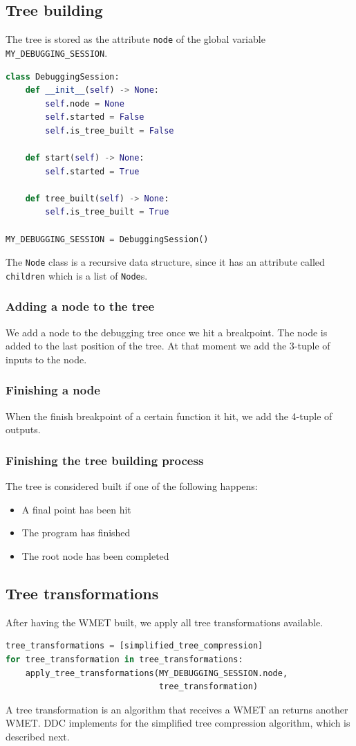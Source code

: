 \subsection{Tree building}
The tree is stored as the attribute \verb|node| of the global variable \verb|MY_DEBUGGING_SESSION|.
\begin{lstlisting}[language=Python, caption=DebuggingSession class and global object]
class DebuggingSession:
    def __init__(self) -> None:
        self.node = None
        self.started = False
        self.is_tree_built = False

    def start(self) -> None:
        self.started = True

    def tree_built(self) -> None:
        self.is_tree_built = True

MY_DEBUGGING_SESSION = DebuggingSession()
\end{lstlisting}
The \verb|Node| class is a recursive data structure, since it has an attribute called \verb|children| which is a list of \verb|Node|s.
\subsubsection{Adding a node to the tree}
We add a node to the debugging tree once we hit a breakpoint.
The node is added to the last position of the tree.
At that moment we add the 3-tuple of inputs to the node.
\subsubsection{Finishing a node}
When the finish breakpoint of a certain function it hit, we add the 4-tuple of outputs.
\subsubsection{Finishing the tree building process}
The tree is considered built if one of the following happens:
\begin{itemize}
    \item A final point has been hit
    \item The program has finished
    \item The root node has been completed
\end{itemize}
\subsection{Tree transformations}
After having the WMET built, we apply all tree transformations available.
\begin{lstlisting}[language=Python, caption=Applying all tree transformations]
tree_transformations = [simplified_tree_compression]
for tree_transformation in tree_transformations:
    apply_tree_transformations(MY_DEBUGGING_SESSION.node,
                               tree_transformation)
\end{lstlisting}
A tree transformation is an algorithm that receives a WMET an returns another WMET.
DDC implements for the simplified tree compression algorithm, which is described next.
